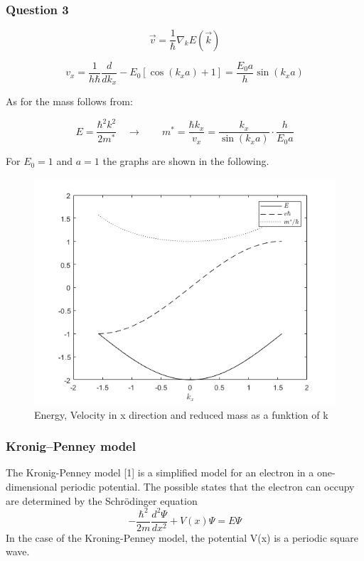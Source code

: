 \subsubsection*{Question 3}

$$\vec{v} = \frac{1}{\hbar} \nabla_k E(\vec{k})$$

$$v_x = \frac{1}{h\hbar} \frac{d}{dk_x} -E_0\left[\cos(k_xa)+1\right] = \frac{E_0a}{h} \sin(k_xa)$$

As for the mass follows from:

$$E = \frac{\hbar^2k^2}{2m^*} \quad \rightarrow \qquad m^* = \frac{\hbar k_x}{v_x}  = \frac{k_x}{\sin(k_xa)} \cdot \frac{h}{E_0a}$$

For $E_0 = 1$ and $a=1$ the graphs are shown in the following.

\begin{figure}[H]
    \centering
    \includegraphics[width=0.5\linewidth]{Graphics/Chapter2/E_of_K.png}
    \caption{Energy, Velocity in x direction and reduced mass as a funktion of k}
    \label{fig:PNjunction}
  \end{figure}

\subsubsection*{Kronig–Penney model}

The Kronig-Penney model [1] is a simplified model for an electron in a one-dimensional periodic potential. The possible states that the electron can occupy are determined by the Schrödinger equation
\begin{equation}
-\frac{\hbar^2}{2m} \frac{d^2\Psi}{dx^2} + V(x) \Psi = E\Psi
\end{equation}
In the case of the Kroning-Penney model, the potential V(x) is a periodic square wave.